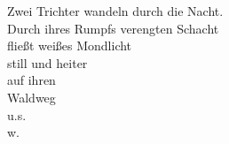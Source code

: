 \begin{german}
  \centering
  Zwei Trichter wandeln durch die Nacht.\\
  Durch ihres Rumpfs verengten Schacht\\
  fließt weißes Mondlicht\\
  still und heiter\\
  auf ihren\\
  Waldweg\\
  u.s.\\
  w.\par
\end{german}
